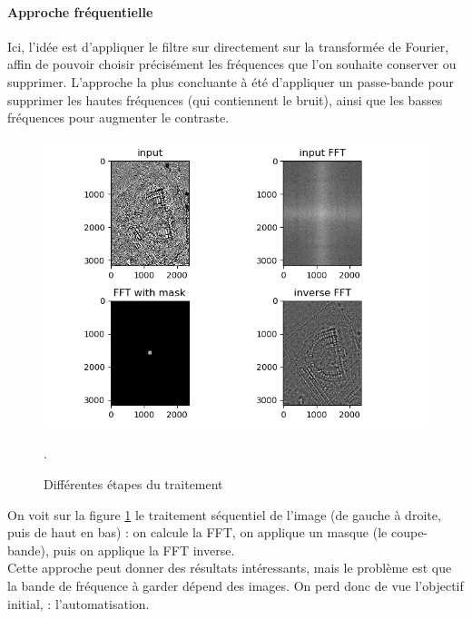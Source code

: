 \documentclass[a4paper, 12pt, titlepage, oneside, french]{article}
\begin{document}
	\paragraph{\textbf{Approche fréquentiell}e}
	Ici, l'idée est d'appliquer le filtre sur directement sur la transformée de Fourier, affin de pouvoir choisir précisément les fréquences que l'on souhaite conserver ou supprimer.
	L'approche la plus concluante à été d'appliquer un passe-bande pour supprimer les hautes fréquences (qui contiennent le bruit), ainsi que les basses fréquences pour augmenter le contraste.
	\begin{figure}[H]
		\centering
		\includegraphics[width=\linewidth]{filter_fft.png}
		\caption{Différentes étapes du traitement}. 
		\label{fig:FilterFFT}
	\end{figure}
	On voit sur la figure \ref{fig:FilterFFT} le traitement séquentiel de l'image (de gauche à droite, puis de haut en bas) : on calcule la FFT, on applique un masque (le coupe-bande), puis on applique la FFT inverse. \\
	Cette approche peut donner des résultats intéressants, mais le problème est que la bande de fréquence à garder dépend des images. On perd donc de vue l'objectif initial, : l'automatisation.

	\newpage
\end{document}
